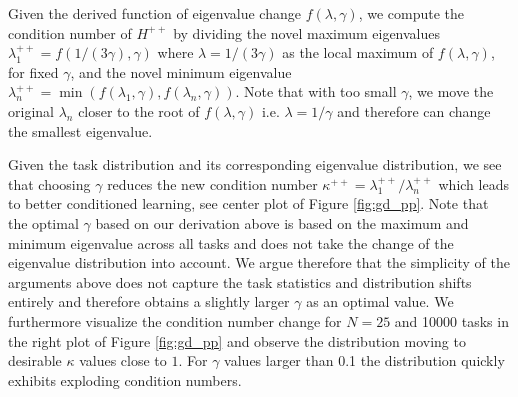 \documentclass{article}
\theoremstyle{plain}
\theoremstyle{definition}
\theoremstyle{remark}
\begin{document}
Given the derived function of eigenvalue change $f(\lambda, \gamma)$, we compute the condition number of $H^{++}$ by dividing the novel maximum eigenvalues $\lambda_1^{++} = f(1/(3\gamma), \gamma)$ where $\lambda = 1/(3\gamma)$ as the local maximum of $f(\lambda, \gamma)$, for fixed $\gamma$, and the novel minimum eigenvalue $\lambda_n^{++} = \min (f(\lambda_1, \gamma),f(\lambda_n, \gamma))$. Note that with too small $\gamma$, we move the original $\lambda_n$ closer to the root of $f(\lambda, \gamma)$ i.e. $\lambda = 1/\gamma$  and therefore can change the smallest eigenvalue. 

Given the task distribution and its corresponding eigenvalue distribution, we see that choosing $\gamma$ reduces the new condition number $\kappa^{++} = \lambda_1^{++}/\lambda_n^{++}$ which leads to better conditioned learning, see center plot of Figure \ref{fig:gd_pp}. Note that the optimal $\gamma$ based on our derivation above is based on the maximum and minimum eigenvalue across all tasks and does not take the change of the eigenvalue distribution into account. We argue therefore that the simplicity of the arguments above does not capture the task statistics and distribution shifts entirely and therefore obtains a slightly larger $\gamma$ as an optimal value. We furthermore visualize the condition number change for $N=25$ and 10000 tasks in the right plot of Figure \ref{fig:gd_pp} and observe the distribution moving to desirable $\kappa$ values close to $1$. For $\gamma$ values larger than 0.1 the distribution quickly exhibits exploding condition numbers. 
\end{document}

